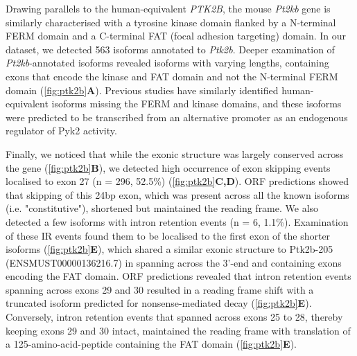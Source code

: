 Drawing parallels to the human-equivalent \textit{PTK2B}, the mouse \textit{Pt2kb} gene is similarly characterised with a tyrosine kinase domain flanked by a N-terminal FERM domain and a C-terminal FAT (focal adhesion targeting) domain\cite{DePins2021}. In our dataset, we detected 563 isoforms annotated to \textit{Ptk2b}. Deeper examination of \textit{Pt2kb}-annotated isoforms revealed isoforms with varying lengths, containing exons that encode the kinase and FAT domain and not the N-terminal FERM domain (\cref{fig:ptk2b}\textbf{A}). Previous studies have similarly identified human-equivalent isoforms missing the FERM and kinase domains\cite{DePins2021}, and these isoforms were predicted to be transcribed from an alternative promoter as an endogenous regulator of Pyk2 activity\cite{DePins2021}.

Finally, we noticed that while the exonic structure was largely conserved across the gene (\cref{fig:ptk2b}\textbf{B}), we detected high occurrence of exon skipping events localised to exon 27 (n = 296, 52.5\%) (\cref{fig:ptk2b}\textbf{C,D}). ORF predictions showed that skipping of this 24bp exon, which was present across all the known isoforms (i.e. "constitutive"), shortened but maintained the reading frame. We also detected a few isoforms with intron retention events (n = 6, 1.1\%). Examination of these IR events found them to be localised to the first exon of the shorter isoforms  (\cref{fig:ptk2b}\textbf{E}), which shared a similar exonic structure to Ptk2b-205 (ENSMUST00000136216.7) in spanning across the 3'-end and containing exons encoding the FAT domain. ORF predictions revealed that intron retention events spanning across exons 29 and 30 resulted in a reading frame shift with a truncated isoform predicted for nonsense-mediated decay (\cref{fig:ptk2b}\textbf{E}). Conversely, intron retention events that spanned across exons 25 to 28, thereby keeping exons 29 and 30 intact, maintained the reading frame with translation of a 125-amino-acid-peptide containing the FAT domain (\cref{fig:ptk2b}\textbf{E}). 


